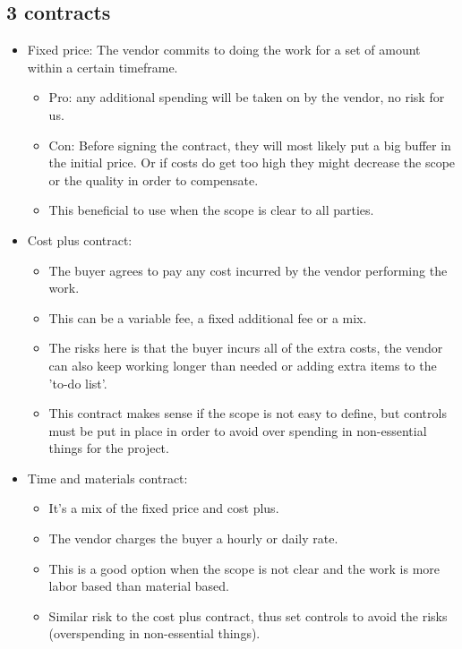 \subsection{3 contracts}
\begin{itemize}
    \item Fixed price: The vendor commits to doing the work for a set of amount within a certain timeframe.
        \begin{itemize}
            \item Pro: any additional spending will be taken on by the vendor, no risk for us.
            \item Con: Before signing the contract, they will most likely put a big buffer in the initial price. Or if costs do get too high they might decrease the scope or the quality in order to compensate.
            \item This beneficial to use when the scope is clear to all parties. 
        \end{itemize}
    
    \item Cost plus contract:
        \begin{itemize}
            \item The buyer agrees to pay any cost incurred by the vendor performing the work. 
            \item This can be a variable fee, a fixed additional fee or a mix.
            \item The risks here is that the buyer incurs all of the extra costs, the vendor can also keep working longer than needed or adding extra items to the 'to-do list'.
            \item This contract makes sense if the scope is not easy to define, but controls must be put in place in order to avoid over spending in non-essential things for the project. 
        \end{itemize}
    
    \item Time and materials contract:
        \begin{itemize}
            \item It's a mix of the fixed price and cost plus.
            \item The vendor charges the buyer a hourly or daily rate.
            \item This is a good option when the scope is not clear and the work is more labor based than material based. 
            \item Similar risk to the cost plus contract, thus set controls to avoid the risks (overspending in non-essential things).
        \end{itemize}
\end{itemize}

